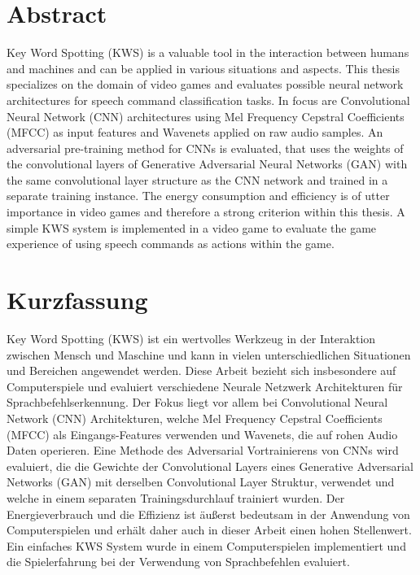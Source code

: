 
\chapter*{Abstract}\label{sec:shards_abstract}
\thesisStateReady
Key Word Spotting (KWS) is a valuable tool in the interaction between humans and machines and can be applied in various situations and aspects.
This thesis specializes on the domain of video games and evaluates possible neural network architectures for speech command classification tasks.
In focus are Convolutional Neural Network (CNN) architectures using Mel Frequency Cepstral Coefficients (MFCC) as input features and Wavenets applied on raw audio samples.
An adversarial pre-training method for CNNs is evaluated, that uses the weights of the convolutional layers of Generative Adversarial Neural Networks (GAN) with the same convolutional layer structure as the CNN network and trained in a separate training instance.
The energy consumption and efficiency is of utter importance in video games and therefore a strong criterion within this thesis.
A simple KWS system is implemented in a video game to evaluate the game experience of using speech commands as actions within the game.



\chapter*{Kurzfassung}
\thesisStateReady
Key Word Spotting (KWS) ist ein wertvolles Werkzeug in der Interaktion zwischen Mensch und Maschine und kann in vielen unterschiedlichen Situationen und Bereichen angewendet werden.
Diese Arbeit bezieht sich insbesondere auf Computerspiele und evaluiert verschiedene Neurale Netzwerk Architekturen für Sprachbefehlserkennung.
Der Fokus liegt vor allem bei Convolutional Neural Network (CNN) Architekturen, welche Mel Frequency Cepstral Coefficients (MFCC) als Eingangs-Features verwenden und Wavenets, die auf rohen Audio Daten operieren.
Eine Methode des Adversarial Vortrainierens von CNNs wird evaluiert, die die Gewichte der Convolutional Layers eines Generative Adversarial Networks (GAN) mit derselben Convolutional Layer Struktur, verwendet und welche in einem separaten Trainingsdurchlauf trainiert wurden.
Der Energieverbrauch und die Effizienz ist äußerst bedeutsam in der Anwendung von Computerspielen und erhält daher auch in dieser Arbeit einen hohen Stellenwert.
Ein einfaches KWS System wurde in einem Computerspielen implementiert und die Spielerfahrung bei der Verwendung von Sprachbefehlen evaluiert.